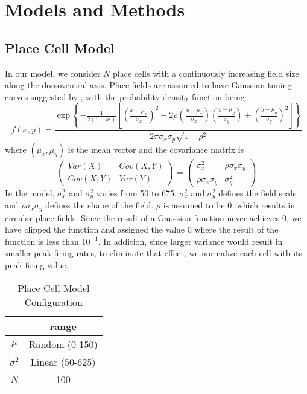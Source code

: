 \documentclass[11pt, letterpaper, onecolumn]{article}
\begin{document}
\section{Models and Methods}

\subsection{Place Cell Model}
In our model, we consider $N$ place cells with a continuously increasing field size along the dorsoventral axis. Place fields are assumed to have Gaussian tuning curves suggested by \cite{OKeefe:Geometric96}, with the probability density function being
\begin{equation}
\label{eq:placemodel}
f(x,y)=\frac{\exp \left\{ -\frac 1{2(1-\rho ^2)}\left[ \left( \frac{x-\mu _x%
}{\sigma _x}\right) ^2-2\rho \left( \frac{x-\mu _x}{\sigma _x}\right) \left( 
\frac{y-\mu _y}{\sigma _y}\right) +\left( \frac{y-\mu _y}{\sigma _y}\right)
^2\right] \right\} }{2\pi \sigma _x\sigma _y\sqrt{1-\rho ^2}} 
\end{equation}
where $(\mu _x,\mu _y)$ is the mean vector and the covariance matrix is
\begin{equation}
\left( 
\begin{array}{cc}
Var(X) & Cov(X,Y) \\ 
Cov(X,Y) & Var(Y)
\end{array}
\right) =\left( 
\begin{array}{cc}
\sigma _x^2 & \rho \sigma _x\sigma _y \\ 
\rho \sigma _x\sigma _y & \sigma _y^2
\end{array}
\right) 
\end{equation}
In the model, $ \sigma _x^2 $ and $ \sigma _y^2 $ varies from 50 to 675. $ \sigma _x^2 $ and $ \sigma _y^2 $ defines the field scale and $ \rho \sigma _x\sigma _y $ defines the shape of the field. $ \rho $ is assumed to be 0, which results in circular place fields. Since the result of a Gaussian function never achieves 0, we have clipped the function and assigned the value 0 where the result of the function is less than $ 10^{-1} $. In addition, since larger variance would result in smaller peak firing rates, to eliminate that effect, we normalize each cell with its peak firing value.

\begin{table}[!htbp]
\centering
\caption{Place Cell Model Configuration}
\label{tab:place}
\begin{tabular}{c|c}
\hline
       & range     \\ \hline
$\mu$  & Random (0-150)      \\ \hline
$\sigma^2$ &  Linear (50-625) \\ \hline
$ N $ & 100 \\ \hline
\end{tabular}
\end{table}
\end{document}
